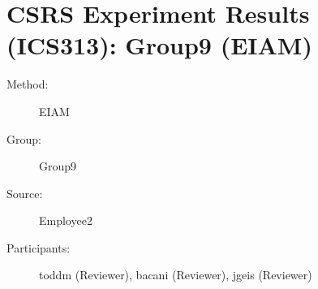
%          
\chapter {CSRS Experiment Results (ICS313): Group9 (EIAM)}
\small

\begin{description}
\item [Method:] EIAM
\item [Group:] Group9
\item [Source:] Employee2
\item [Participants:] toddm (Reviewer), bacani (Reviewer), jgeis (Reviewer)
\end{description}
